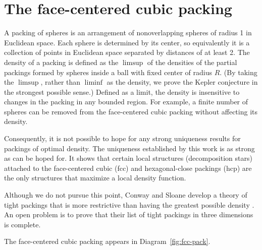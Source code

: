 










\section{The face-centered cubic packing}

A packing of spheres is an arrangement of
nonoverlapping spheres of radius 1 in Euclidean space.
Each sphere is determined by its center, so equivalently it is a collection
of points in Euclidean space separated by distances of at least 2.
The density of a packing is defined as the $\limsup$ of
the densities of the partial packings formed by spheres inside
a ball with fixed center of radius $R$.
(By taking the $\limsup$,
rather than $\liminf$ as the density, we prove the Kepler
conjecture in the strongest possible sense.)
Defined as a limit, the density
is insensitive to changes in the packing in any bounded region.
For example, a finite number of spheres can be removed from the
face-centered cubic packing without affecting its density.

Consequently, it is not possible to hope for any strong uniqueness results
for packings of optimal density.  The uniqueness established by this
work is as strong as can be hoped for.
It shows that certain local
structures (decomposition stars)
attached to the face-centered cubic (fcc) and hexagonal-close
packings (hcp)
are the only structures that maximize a local density function.

Although we do not pursue this point, Conway and Sloane develop
a theory of tight packings that is more restrictive than having the
greatest possible density \cite{CoSl95}.
An open problem is to prove that their
list of tight packings in three dimensions is complete.

The face-centered cubic packing appears in
Diagram~\ref{fig:fcc-pack}.

